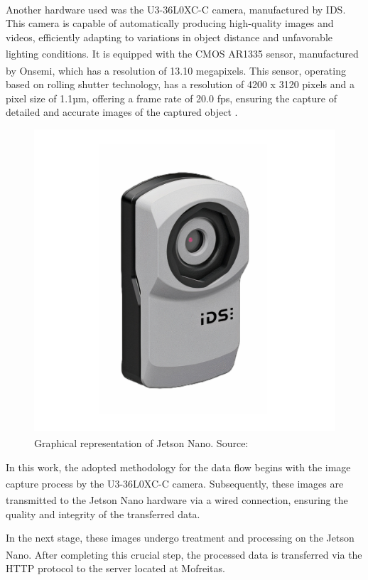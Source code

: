 Another hardware used was the U3-36L0XC-C\textsuperscript{\textregistered} camera, manufactured by IDS\textsuperscript{\textregistered}. This camera is capable of automatically producing high-quality images and videos, efficiently adapting to variations in object distance and unfavorable lighting conditions. It is equipped with the CMOS AR1335\textsuperscript{\textregistered} sensor, manufactured by Onsemi\textsuperscript{\textregistered}, which has a resolution of 13.10 megapixels. This sensor, operating based on rolling shutter technology, has a resolution of 4200 x 3120 pixels and a pixel size of 1.1µm, offering a frame rate of 20.0 fps, ensuring the capture of detailed and accurate images of the captured object \cite{ids_imaging_development_systemsu3-36l0xc_2023}.


\begin{figure}[ht!]
\centering
\includegraphics[width=.65\linewidth]{images/Development/chap3/IDS_CAMERA.png}
\caption{Graphical representation of Jetson Nano\textsuperscript{\textregistered}. Source: \cite{nvidia_jetson_2019}}
\label{fig: jetson}
\end{figure}

In this work, the adopted methodology for the data flow begins with the image capture process by the U3-36L0XC-C\textsuperscript{\textregistered} camera. Subsequently, these images are transmitted to the Jetson Nano\textsuperscript{\textregistered} hardware via a wired connection, ensuring the quality and integrity of the transferred data.

In the next stage, these images undergo treatment and processing on the Jetson Nano\textsuperscript{\textregistered}. After completing this crucial step, the processed data is transferred via the HTTP protocol to the server located at Mofreitas.

